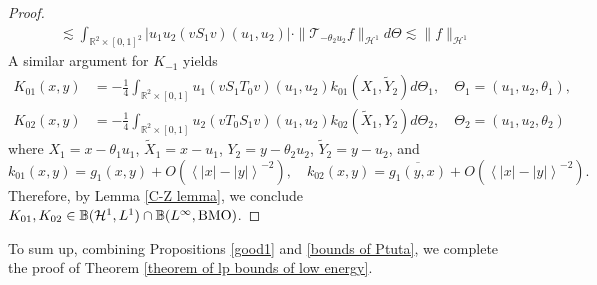 \documentclass[reqno]{amsart}
\newcommand\R{\mathbb{R}}
\newcommand\B{\mathbb{B}}
\newcommand\HH{\mathcal{H}}
\newcommand\mcaT{\mathcal{T}}
\numberwithin{equation}{section}
\begin{document}
\begin{proof}
\begin{align*}
&\lesssim \int_{\R^2\times[0,1]^2}|u_1u_2(vS_1v)(u_1,u_2)|\cdot\|\mcaT_{-\theta_2u_2} f\|_{\HH^1}d\Theta\lesssim \|f\|_{\HH^1}
\end{align*}
A similar argument for  $K_{-1}$ yields
\begin{align*}
K_{01}(x,y)&=-\frac{1}{4}\int_{\R^2\times[0,1]}u_1(vS_1T_0v)(u_1,u_2)k_{01}(X_1,\widetilde{Y}_2)d{\Theta}_1,\quad {\Theta}_1=(u_1,u_2,\theta_1),\\
K_{02}(x,y)&=-\frac{1}{4}\int_{\R^2\times[0,1]}u_2(vT_0S_1v)(u_1,u_2)k_{02}(\widetilde{X}_1,{Y}_2)d{\Theta}_2,\quad {\Theta}_2=(u_1,u_2,\theta_2)
\end{align*}
where $X_1=x-\theta_1u_1$, $\widetilde{X}_1=x-u_1$, ${Y}_2=y-\theta_2u_2$, $\widetilde{Y}_2=y-u_2$, and
$$k_{01}(x,y)=g_1(x,y)+O(\left<|x|-|y|\right>^{-2}),\quad k_{02}(x,y)=\overline{g_1(y,x)}+O(\left<|x|-|y|\right>^{-2}).$$
Therefore, by Lemma \ref{C-Z lemma}, we conclude $K_{01},K_{02}\in \B(\HH^1,L^1)\cap\B(L^{\infty},{\rm BMO})$.
\end{proof}
To sum up, combining Propositions \ref{good1} and \ref{bounds of Ptuta}, we complete the proof of Theorem \ref{theorem of lp bounds of low energy}. 
\end{document}
